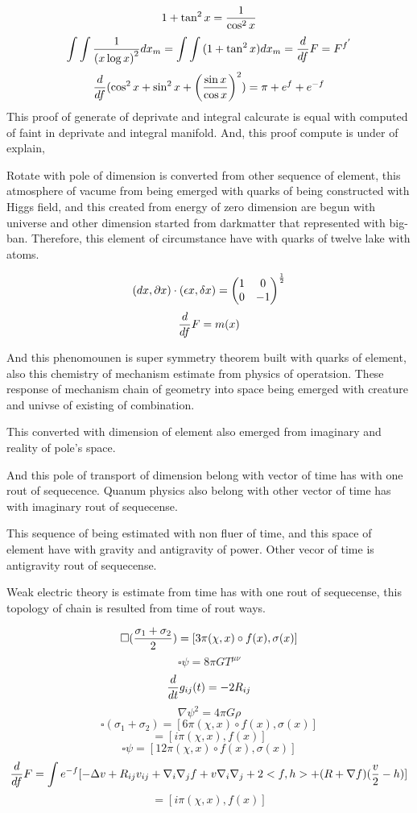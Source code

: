 \documentclass{jsarticle}
\begin{document}
  $$ 1 + \tan^2 x = {1 \over {\cos^2 x}}$$
  $$ \int\int{1 \over {(x\log x)}^{2}}dx_m
  = \int\int{(1 + \tan^2 x)}dx_m = {d \over {d f}}{F}=F^{f^{'}} $$ 
  $${d \over {d f}}{(\cos^2 x + \sin^2 x + 
  {\left({{\sin x} \over {\cos x}}\right)}^2)} = \pi + e^{f} + e^{-f} $$
  This proof of generate of deprivate and integral calcurate is equal with
  computed of faint in deprivate and integral manifold.
  And, this proof compute is under of explain,

 Rotate with pole of dimension is converted from other sequence of element,  
this atmosphere of vacume from being emerged with quarks of being constructed
with Higgs field, and this created from energy of zero dimension are begun with
universe and other dimension started from darkmatter that represented with 
big-ban.
Therefore, this element of circumstance have with quarks of twelve lake with
atoms.

  $$ (dx, \partial x)\cdot (\epsilon x, \delta x) = \begin{pmatrix}
	  1 & 0 \\
  0 & - 1 \end{pmatrix}^{1 \over 2}  $$
  $$ {d \over df} F = m(x) $$

 And this phenomounen is super symmetry theorem built with quarks of element, 
also this chemistry of mechanism estimate from physics of operatsion.
These response of mechanism chain of geometry into space being emerged with
creature and univse of existing of combination.

  This converted with dimension of element also emerged from imaginary and 
reality of pole's space.

  And this pole of transport of dimension belong with vector of time has 
with one rout of sequecence. Quanum physics also belong with other vector 
of time has with imaginary rout of sequecense.

 This sequence of being estimated with non fluer of time, and this space 
of element have with gravity and antigravity of power.
Other vecor of time is antigravity rout of sequecense.

 Weak electric theory is estimate from time has with one rout of sequecense,
this topology of chain is resulted from time of rout ways.

     $$ \square ({{\sigma_1 + \sigma_2} \over 2 }) = [3 \pi (\chi,x) \circ f(x),
   \sigma(x)] $$
   $$ \square \psi = 8 \pi G T^{\mu\nu} $$
   $$ {d \over dt}g_{ij}(t) = - 2 R_{ij} $$
   $$ \nabla \psi^2 = 4 \pi G \rho $$
   $$ \square (\sigma_1 + \sigma_2) = [6\pi(\chi,x)\circ f(x), \sigma(x)] $$
   $$ = [i \pi(\chi,x),f(x)] $$
   $$ \square \psi = [12 \pi (\chi,x)\circ f(x), \sigma(x)] $$
   $$ {d \over df} F = \int e^{-f}[- \Delta v + R_{ij} v_{ij}+ 
   \nabla_i \nabla_j f  + v \nabla_i \nabla_j + 2<f,h> + (R + \nabla f)
   ({v \over 2} - h) ] $$
   $$ =[i \pi(\chi,x), f(x)] $$
\end{document}
